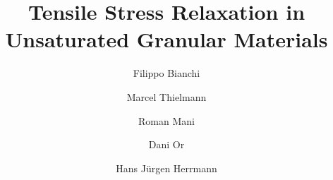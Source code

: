 %
%
%
%
%

\RequirePackage{fix-cm}
%
\documentclass[twocolumn]{svjour3}          %
%
\smartqed  %
%
\usepackage{graphicx}
\usepackage{siunitx}
\usepackage{amsmath}
\usepackage{epstopdf}
%
%
\usepackage[misc,geometry]{ifsym} 
%
%
%


\title{Tensile Stress Relaxation in Unsaturated Granular Materials
}


\author{Filippo Bianchi\and Marcel Thielmann\and Roman Mani\and Dani Or\and Hans J\"urgen Herrmann}

